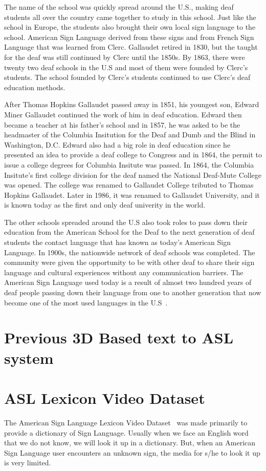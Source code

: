 The name of the school was quickly spread around the U.S., making deaf students all over the country came together to study in this school. Just like the school in Europe, the students also brought their own local sign language to the school. American Sign Language derived from these signs and from French Sign Language that was learned from Clerc. Gallaudet retired in 1830, but the taught for the deaf was still continued by Clerc until the 1850s. By 1863, there were twenty two deaf schools in the U.S and most of them were founded by Clerc's students. The school founded by Clerc's students continued to use Clerc's deaf education methods.

After Thomas Hopkins Gallaudet passed away in 1851, his youngest son, Edward Miner Gallaudet continued the work of him in deaf education. Edward then became a teacher at his father's school and in 1857, he was asked to be the headmaster of the Columbia Insitution for the Deaf and Dumb and the Blind in Washington, D.C. Edward also had a big role in deaf education since he presented an idea to provide a deaf college to Congress and in 1864, the permit to issue a college degrees for Columbia Insitute was passed. In 1864, the Columbia Insitute's first college division for the deaf named the National Deaf-Mute College was opened. The college was renamed to Gallaudet College tributed to Thomas Hopkins Gallaudet. Later in 1986, it was renamed to Gallaudet University, and it is known today as the first and only deaf univerity in the world.

The other schools spreaded around the U.S also took roles to pass down their education from the American School for the Deaf to the next generation of deaf students the contact language that has known as today's American Sign Language. In 1900s, the nationwide network of deaf schools was completed. The community were given the opportunity to be with other deaf to share their sign language and cultural experiences without any communication barriers. The American Sign Language used today is a result of almost two hundred years of deaf people passing down their language from one to another generation that now become one of the most used languages in the U.S~\cite{dawnSignPress}.

\section{Previous 3D Based text to ASL system}
\label{sec:2_3dBased}

\section{ASL Lexicon Video Dataset}
\label{sec:3_ASLDataset}
The American Sign Language Lexicon Video Dataset~\cite{ASLLexiconVideoDataset} was made primarily to provide a dictionary of Sign Language. Usually when we face an English word that we do not know, we will look it up in a dictionary. But, when an American Sign Language user encounters an unknown sign, the media for s/he to look it up is very limited.

